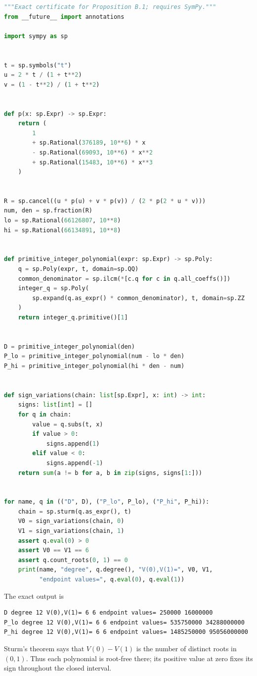 \documentclass[11pt,oneside]{article}
\numberwithin{equation}{section}
\theoremstyle{definition}
\theoremstyle{remark}
\begin{document}
\begin{lstlisting}[style=code,language=Python]
"""Exact certificate for Proposition B.1; requires SymPy."""
from __future__ import annotations

import sympy as sp


t = sp.symbols("t")
u = 2 * t / (1 + t**2)
v = (1 - t**2) / (1 + t**2)


def p(x: sp.Expr) -> sp.Expr:
    return (
        1
        + sp.Rational(376189, 10**6) * x
        - sp.Rational(69093, 10**6) * x**2
        + sp.Rational(15483, 10**6) * x**3
    )


R = sp.cancel((u * p(u) + v * p(v)) / (2 * p(2 * u * v)))
num, den = sp.fraction(R)
lo = sp.Rational(66126807, 10**8)
hi = sp.Rational(66134891, 10**8)


def primitive_integer_polynomial(expr: sp.Expr) -> sp.Poly:
    q = sp.Poly(expr, t, domain=sp.QQ)
    common_denominator = sp.ilcm(*[c.q for c in q.all_coeffs()])
    integer_q = sp.Poly(
        sp.expand(q.as_expr() * common_denominator), t, domain=sp.ZZ
    )
    return integer_q.primitive()[1]


D = primitive_integer_polynomial(den)
P_lo = primitive_integer_polynomial(num - lo * den)
P_hi = primitive_integer_polynomial(hi * den - num)


def sign_variations(chain: list[sp.Expr], x: int) -> int:
    signs: list[int] = []
    for q in chain:
        value = q.subs(t, x)
        if value > 0:
            signs.append(1)
        elif value < 0:
            signs.append(-1)
    return sum(a != b for a, b in zip(signs, signs[1:]))


for name, q in (("D", D), ("P_lo", P_lo), ("P_hi", P_hi)):
    chain = sp.sturm(q.as_expr(), t)
    V0 = sign_variations(chain, 0)
    V1 = sign_variations(chain, 1)
    assert q.eval(0) > 0
    assert V0 == V1 == 6
    assert q.count_roots(0, 1) == 0
    print(name, "degree", q.degree(), "V(0),V(1)=", V0, V1,
          "endpoint values=", q.eval(0), q.eval(1))
\end{lstlisting}

The exact output is
\begin{lstlisting}[style=code]
D degree 12 V(0),V(1)= 6 6 endpoint values= 250000 16000000
P_lo degree 12 V(0),V(1)= 6 6 endpoint values= 535750000 34288000000
P_hi degree 12 V(0),V(1)= 6 6 endpoint values= 1485250000 95056000000
\end{lstlisting}
Sturm's theorem says that \(V(0)-V(1)\) is the number of distinct roots in \((0,1)\).
Thus each polynomial is root-free there; its positive value at zero fixes its sign throughout
the closed interval.
\end{document}
